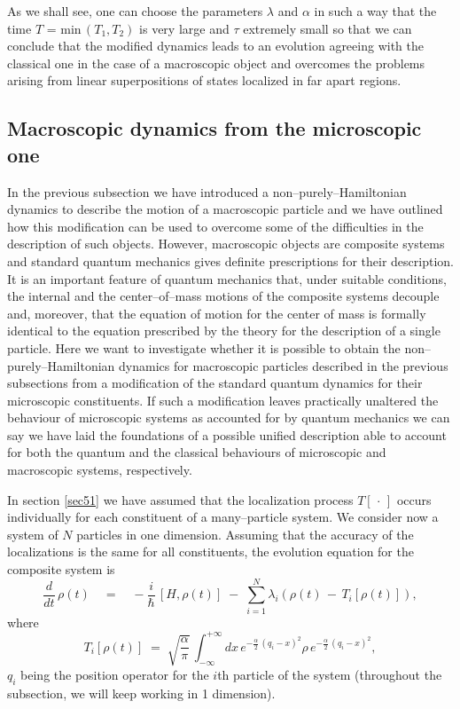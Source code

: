 \documentclass[10pt,a4paper]{article}
\begin{document}
As we shall see, one can choose the parameters $\lambda$ and
$\alpha$ in such a way that the time $T$ = min$\,(T_{1}, T_{2})$
is very large and $\tau$ extremely small so that we can conclude
that the modified dynamics leads to an evolution agreeing with the
classical one in the case of a macroscopic object and overcomes
the problems arising from linear superpositions of states
localized in far apart regions.


\subsection{Macroscopic dynamics from the microscopic one}
\label{sec54}

In the previous subsection we have introduced a
non--purely--Hamiltonian dynamics to describe the motion of a
macroscopic particle and we have outlined how this modification
can be used to overcome some of the difficulties  in the
description of such objects. However, macroscopic objects are
composite systems and standard quantum mechanics gives definite
prescriptions for their description. It is an important feature of
quantum mechanics that, under suitable conditions, the internal
and the center--of--mass  motions of the composite systems
decouple and, moreover, that the equation of motion for the center
of mass is formally identical to the equation prescribed by the
theory for the description of a single particle. Here we want to
investigate whether it is possible to obtain the
non--purely--Hamiltonian dynamics for macroscopic particles
described in the previous subsections from a modification of the
standard quantum dynamics for their microscopic constituents. If
such a modification leaves practically unaltered the behaviour of
microscopic systems as accounted for by quantum mechanics we can
say we have laid the foundations of a possible unified description
able to account for both the quantum and the classical behaviours
of  microscopic and macroscopic systems, respectively.

In section \ref{sec51} we have assumed that the localization
process $T[\,\cdot\,]$ occurs individually for each constituent of
a many--particle system. We consider now a system of $N$ particles
in one dimension. Assuming that the accuracy of the localizations
is the same for all constituents, the evolution equation for the
composite system is
\begin{equation} \label{pclm}
\frac{d}{dt}\, \rho(t) \quad = \quad -\frac{i}{\hbar}\, [H,
\rho(t)] \; - \; \sum_{i=1}^{N} \lambda_{i} \left( \rho(t) \, - \,
T_{i}[\rho(t)]\right),
\end{equation}
where
\begin{equation} \label{nhdn}
T_{i}[\rho(t)] \; = \; \sqrt{\frac{\alpha}{\pi}}\,
\int_{-\infty}^{+\infty} dx\, e^{\displaystyle -
\frac{\alpha}{2}\, (q_{i} - x)^{2}} \rho\, e^{\displaystyle -
\frac{\alpha}{2}\, (q_{i} - x)^{2}},
\end{equation}
$q_{i}$ being the position operator for the $i$th particle of the
system (throughout the subsection, we will keep working in 1
dimension).
\end{document}
